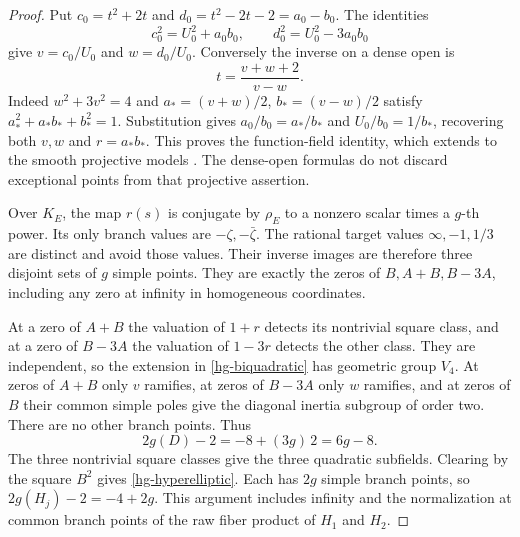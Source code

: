 \begin{proof}
Put $c_0=t^2+2t$ and $d_0=t^2-2t-2=a_0-b_0$.
The identities
\[
 c_0^2=U_0^2+a_0b_0,\qquad d_0^2=U_0^2-3a_0b_0
\]
give $v=c_0/U_0$ and $w=d_0/U_0$. Conversely the inverse on a
dense open is
\begin{equation}\label{hg-inverse}
 t=\frac{v+w+2}{v-w}.
\end{equation}
Indeed $w^2+3v^2=4$ and
$a_*=(v+w)/2$, $b_*=(v-w)/2$ satisfy
$a_*^2+a_*b_*+b_*^2=1$. Substitution gives
$a_0/b_0=a_*/b_*$ and $U_0/b_0=1/b_*$, recovering both $v,w$
and $r=a_*b_*$. This proves the function-field identity, which
extends to the smooth projective models
\cite{StacksCurves2026}. The dense-open formulas do not discard
exceptional points from that projective assertion.

Over $K_E$, the map $r(s)$ is conjugate by $\rho_E$ to a nonzero
scalar times a $g$-th power. Its only branch values are
$-\zeta,-\bar\zeta$. The rational target values
$\infty,-1,1/3$ are distinct and avoid those values. Their
inverse images are therefore three disjoint sets of $g$ simple
points. They are exactly the zeros of $B,A+B,B-3A$, including
any zero at infinity in homogeneous coordinates.

At a zero of $A+B$ the valuation of $1+r$ detects its nontrivial
square class, and at a zero of $B-3A$ the valuation of $1-3r$
detects the other class. They are independent, so the extension
in \eqref{hg-biquadratic} has geometric group $V_4$.
At zeros of $A+B$ only $v$ ramifies, at zeros of $B-3A$ only
$w$ ramifies, and at zeros of $B$ their common simple poles
give the diagonal inertia subgroup of order two. There are no
other branch points. Thus
\[
 2g(D)-2=-8+(3g)\,2=6g-8.
\]
The three nontrivial square classes give the three quadratic
subfields. Clearing by the square $B^2$ gives
\eqref{hg-hyperelliptic}. Each has $2g$ simple branch points,
so $2g(H_j)-2=-4+2g$.
This argument includes infinity and the normalization at common
branch points of the raw fiber product of $H_1$ and $H_2$.
\end{proof}

